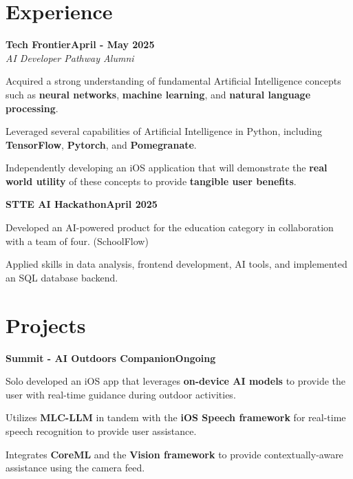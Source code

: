 \documentclass[letterpaper,10pt]{article}
\newcommand{\heading}[2]{
  \hspace{10pt}#1\hfill#2\\
}
\newcommand{\headingBf}[2]{
  \heading{\textbf{#1}}{\textbf{#2}}
}
\newcommand{\headingIt}[2]{
  \heading{\textit{#1}}{\textit{#2}}
}
\newenvironment{resume_list}{
  \vspace{-7pt}
  \begin{itemize}[itemsep=-2px, parsep=1pt, leftmargin=30pt]
}{
  \end{itemize}
}
\begin{document}
  \section{Experience}

\headingBf{\large{Tech Frontier}}{April - May 2025}
\headingIt{AI Developer Pathway Alumni}{}
\begin{resume_list}
  \item Acquired a strong understanding of fundamental Artificial Intelligence concepts such as \textbf{neural networks}, \textbf{machine learning}, and \textbf{natural language processing}.
  \vspace{1pt}
  \item Leveraged several capabilities of Artificial Intelligence in Python, including \textbf{TensorFlow}, \textbf{Pytorch}, and \textbf{Pomegranate}.
  \vspace{1pt}
  \item Independently developing an iOS application that will demonstrate the \textbf{real world utility} of these concepts to provide \textbf{tangible user benefits}.
  \vspace{2pt}
\end{resume_list}

\headingBf{\large{STTE AI Hackathon}}{April 2025}
\begin{resume_list}
  \item Developed an AI-powered product for the education category in collaboration with a team of four. (SchoolFlow)
  \vspace{1pt}
  \item Applied skills in data analysis, frontend development, AI tools, and implemented an SQL database backend.
  \vspace{-2pt}
\end{resume_list}


\vspace{0pt}
\section{\large{Projects}}

\vspace{1pt}
\headingBf{\large{Summit - AI Outdoors Companion}}{Ongoing}
\begin{resume_list}
  \vspace{1pt}
    \item Solo developed an iOS app that leverages \textbf{on-device AI models} to provide the user with real-time guidance during outdoor activities.
    \vspace{1pt}
    \item Utilizes \textbf{MLC-LLM} in tandem with the \textbf{iOS Speech framework} for real-time speech recognition to provide user assistance.
    \vspace{1pt}
    \item Integrates \textbf{CoreML} and the \textbf{Vision framework} to provide contextually-aware assistance using the camera feed.
\end{resume_list}
\end{document}

